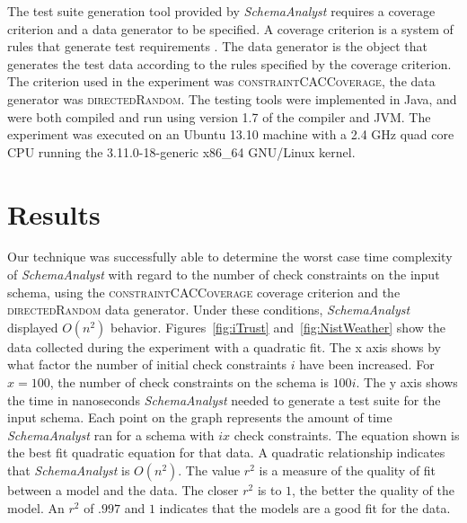 \documentclass[smallextended]{svjour3}       %
\begin{document}
The test suite generation tool provided by \textit{SchemaAnalyst}
requires a coverage criterion and a data generator to be specified. A
coverage criterion is a system of rules that generate test requirements
\cite{Ammann:Testing}. The data generator is the object that generates
the test data according to the rules specified by the coverage
criterion. The criterion used in the experiment was
\textsc{constraintCACCoverage}, 
the data generator was \textsc{directedRandom}. The
testing tools were implemented in Java, and were both compiled and run using
version 1.7 of the compiler and JVM. The experiment was executed on an Ubuntu 13.10 machine with a 2.4
GHz quad core CPU running the 3.11.0-18-generic x86\_64 GNU/Linux
kernel.

\section{Results}
Our technique was successfully able to determine the worst case time
complexity of \textit{SchemaAnalyst} with regard to the number of check
constraints on the input schema, using the
\textsc{constraintCACCoverage} coverage criterion and the
\textsc{directedRandom} data generator. Under these conditions, 
\textit{SchemaAnalyst} displayed $O(n^2)$ behavior. Figures~\ref{fig:iTrust} 
and~\ref{fig:NistWeather} show the data collected during the experiment with a
quadratic fit. The x axis shows by what factor the number of initial
check constraints $i$ have been increased. For $x = 100$, the number of check
constraints on the schema is $100i$. The y axis shows the time in
nanoseconds \textit{SchemaAnalyst} needed to generate a test suite for
the input schema. Each point on the graph represents the amount of time
\textit{SchemaAnalyst} ran for a schema with $ix$ check constraints.
The equation shown is the best fit quadratic equation for that data.  A
quadratic relationship indicates that \textit{SchemaAnalyst} is
$O(n^2)$.  The value $r^2$ is a measure of the quality of fit between a model and
the data. The closer $r^2$ is to $1$, the better the quality of the
model.  An $r^2$ of $.997$ and $1$ indicates that the models are a good fit for
the data.
\end{document}
